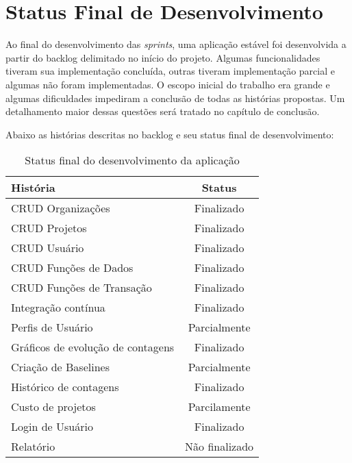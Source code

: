 \section{Status Final de Desenvolvimento}

Ao final do desenvolvimento das \textit{sprints}, uma aplicação estável foi desenvolvida a partir do backlog delimitado no início do projeto. Algumas funcionalidades tiveram sua implementação concluída, outras tiveram implementação parcial e algumas não foram implementadas. O escopo inicial do trabalho era grande e algumas dificuldades impediram a conclusão de todas as histórias propostas. Um detalhamento maior dessas questões será tratado no capítulo de conclusão.

Abaixo as histórias descritas no backlog e seu status final de desenvolvimento:

\begin{table}[h]
\centering
\begin{tabular}{|l|c|}
\hline
\textbf{História}                 & \textbf{Status}                     \\ \hline
CRUD Organizações                 & Finalizado                          \\ \hline
CRUD Projetos                     & Finalizado                          \\ \hline
CRUD Usuário                      & Finalizado                          \\ \hline
CRUD Funções de Dados             & Finalizado                          \\ \hline
CRUD Funções de Transação         & Finalizado                          \\ \hline
Integração contínua               & Finalizado                          \\ \hline
Perfis de Usuário                 & Parcialmente                        \\ \hline
Gráficos de evolução de contagens & Finalizado                          \\ \hline
Criação de Baselines              & Parcialmente                        \\ \hline
Histórico de contagens            & Finalizado                          \\ \hline
Custo de projetos                 & Parcilamente                        \\ \hline
Login de Usuário                  & Finalizado                           \\ \hline
Relatório                         & \multicolumn{1}{l|}{Não finalizado} \\ \hline
\end{tabular}
\caption{Status final do desenvolvimento da aplicação}
\label{status}
\end{table}

